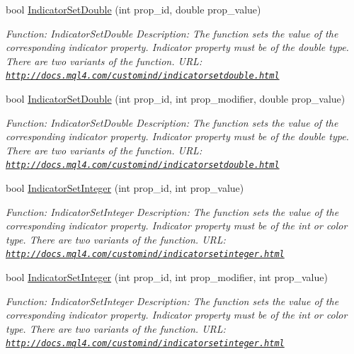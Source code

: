 \begin{DoxyCompactItemize}
bool \hyperlink{class_m_q_l4_c_sharp_1_1_base_1_1_m_q_l_base_a8398e8a8c8510eb3f849931ed847a3e7}{Indicator\+Set\+Double} (int prop\+\_\+id, double prop\+\_\+value)
\begin{DoxyCompactList}\small\item\em Function\+: Indicator\+Set\+Double Description\+: The function sets the value of the corresponding indicator property. Indicator property must be of the double type. There are two variants of the function. U\+RL\+: \href{http://docs.mql4.com/customind/indicatorsetdouble.html}{\tt http\+://docs.\+mql4.\+com/customind/indicatorsetdouble.\+html} \end{DoxyCompactList}\item 
bool \hyperlink{class_m_q_l4_c_sharp_1_1_base_1_1_m_q_l_base_a4a02d817c9d7087e52fd5ea67575b116}{Indicator\+Set\+Double} (int prop\+\_\+id, int prop\+\_\+modifier, double prop\+\_\+value)
\begin{DoxyCompactList}\small\item\em Function\+: Indicator\+Set\+Double Description\+: The function sets the value of the corresponding indicator property. Indicator property must be of the double type. There are two variants of the function. U\+RL\+: \href{http://docs.mql4.com/customind/indicatorsetdouble.html}{\tt http\+://docs.\+mql4.\+com/customind/indicatorsetdouble.\+html} \end{DoxyCompactList}\item 
bool \hyperlink{class_m_q_l4_c_sharp_1_1_base_1_1_m_q_l_base_a68ffff738a185bc7fac2ee07ca7a397e}{Indicator\+Set\+Integer} (int prop\+\_\+id, int prop\+\_\+value)
\begin{DoxyCompactList}\small\item\em Function\+: Indicator\+Set\+Integer Description\+: The function sets the value of the corresponding indicator property. Indicator property must be of the int or color type. There are two variants of the function. U\+RL\+: \href{http://docs.mql4.com/customind/indicatorsetinteger.html}{\tt http\+://docs.\+mql4.\+com/customind/indicatorsetinteger.\+html} \end{DoxyCompactList}\item 
bool \hyperlink{class_m_q_l4_c_sharp_1_1_base_1_1_m_q_l_base_a706353ad47e5d70431d16931a9346445}{Indicator\+Set\+Integer} (int prop\+\_\+id, int prop\+\_\+modifier, int prop\+\_\+value)
\begin{DoxyCompactList}\small\item\em Function\+: Indicator\+Set\+Integer Description\+: The function sets the value of the corresponding indicator property. Indicator property must be of the int or color type. There are two variants of the function. U\+RL\+: \href{http://docs.mql4.com/customind/indicatorsetinteger.html}{\tt http\+://docs.\+mql4.\+com/customind/indicatorsetinteger.\+html} \end{DoxyCompactList}\item 

\end{DoxyCompactItemize}

